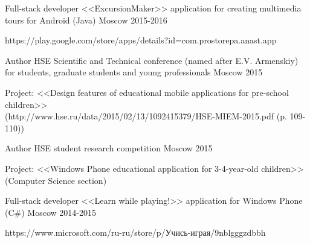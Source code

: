 \begin{cventries}

\cventry
{Full-stack developer} %
{<<ExcursionMaker>> application for creating multimedia tours for Android  (Java) } %
{Moscow} %
{2015-2016} %
{ %
	\begin{cvitems}
		\item {https://play.google.com/store/apps/details?id=com.prostorepa.anast.app}
	\end{cvitems}
}


\cventry
{Author} %
{HSE Scientific and Technical conference (named after E.V. Armenskiy) for students, graduate students and young professionals} %
{Moscow} %
{2015} %
{ %
\begin{cvitems}
\item {Project: <<Design features of educational mobile applications for pre-school children>>
	\\ (http://www.hse.ru/data/2015/02/13/1092415379/HSE-MIEM-2015.pdf (p. 109-110))}
\end{cvitems}
}

\cventry
{Author} %
{HSE student research competition} %
{Moscow} %
{2015} %
{ %
\begin{cvitems}
\item {Project: <<Windows Phone educational application for 3-4-year-old children>> (Computer Science section)}
\end{cvitems}
}


\cventry
{Full-stack developer} %
{<<Learn while playing!>> application for Windows Phone  (C\#) } %
{Moscow} %
{2014-2015} %
{ %
	\begin{cvitems}
		\item {https://www.microsoft.com/ru-ru/store/p/Учись-играя/9nblgggzdbbh}
	\end{cvitems}
}

\end{cventries}